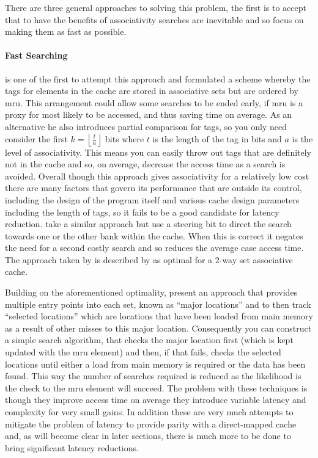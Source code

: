 There are three general approaches to solving this problem, the first is to accept that to have the benefits of associativity searches are inevitable and so focus on making them as fast as possible.

\paragraph{Fast Searching}

\citet{kesslerInexpensiveImplementationsSetAssociativity1989} is one of the first to attempt this approach and formulated a scheme whereby the tags for elements in the cache are stored in associative sets but are ordered by \gls{mru}. This arrangement could allow some searches to be ended early, if \gls{mru} is a proxy for most likely to be accessed, and thus saving time on average. As an alternative he also introduces partial comparison for tags, so you only need consider the first $k = \left\lfloor\frac{t}{a}\right\rfloor$ bits where $t$ is the length of the tag in bits and $a$ is the level of associativity. This means you can easily throw out tags that are definitely not in the cache and so, on average, decrease the access time as a search is avoided. Overall though this approach gives associativity for a relatively low cost there are many factors that govern its performance that are outside its control, including the design of the program itself and various cache design parameters including the length of tags, so it fails to be a good candidate for latency reduction. \citet{calderPredictiveSequentialAssociative1996} take a similar approach but use a steering bit to direct the search towards one or the other bank within the cache. When this is correct it negates the need for a second costly search and so reduces the average case access time. The approach taken by \citeauthor{calderPredictiveSequentialAssociative1996} is described by 
\citet{zhangMulticolumnImplementationsCache1997} as optimal for a 2-way set associative cache.  

Building on the aforementioned optimality, \citeauthor{zhangMulticolumnImplementationsCache1997} present an approach that provides multiple entry points into each set, known as ``major locations'' and to then track ``selected locations'' which are locations that have been loaded from main memory as a result of other misses to this major location. Consequently you can construct a simple search algorithm, that checks the major location first (which is kept updated with the \gls{mru} element) and then, if that fails, checks the selected locations until either a load from main memory is required or the data has been found. This way the number of searches required is reduced as the likelihood is the check to the \gls{mru} element will succeed. The problem with these techniques is though they improve access time on average they introduce variable latency and complexity for very small gains. In addition these are very much attempts to mitigate the problem of latency to provide parity with a direct-mapped cache and, as will become clear in later sections, there is much more to be done to bring significant latency reductions.

